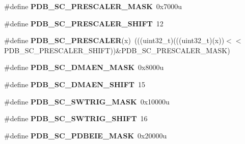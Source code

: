 \begin{DoxyCompactItemize}
\item 
\#define {\bfseries P\+D\+B\+\_\+\+S\+C\+\_\+\+P\+R\+E\+S\+C\+A\+L\+E\+R\+\_\+\+M\+A\+SK}~0x7000u\hypertarget{group__PDB__Register__Masks_ga53e475cc672b4e976c7dccc10fe64d74}{}\label{group__PDB__Register__Masks_ga53e475cc672b4e976c7dccc10fe64d74}

\item 
\#define {\bfseries P\+D\+B\+\_\+\+S\+C\+\_\+\+P\+R\+E\+S\+C\+A\+L\+E\+R\+\_\+\+S\+H\+I\+FT}~12\hypertarget{group__PDB__Register__Masks_gae8062c54fb9d63becd95c6e34399b995}{}\label{group__PDB__Register__Masks_gae8062c54fb9d63becd95c6e34399b995}

\item 
\#define {\bfseries P\+D\+B\+\_\+\+S\+C\+\_\+\+P\+R\+E\+S\+C\+A\+L\+ER}(x)~(((uint32\+\_\+t)(((uint32\+\_\+t)(x))$<$$<$P\+D\+B\+\_\+\+S\+C\+\_\+\+P\+R\+E\+S\+C\+A\+L\+E\+R\+\_\+\+S\+H\+I\+FT))\&P\+D\+B\+\_\+\+S\+C\+\_\+\+P\+R\+E\+S\+C\+A\+L\+E\+R\+\_\+\+M\+A\+SK)\hypertarget{group__PDB__Register__Masks_ga5b7cd747de95052518759e92b7e0f867}{}\label{group__PDB__Register__Masks_ga5b7cd747de95052518759e92b7e0f867}

\item 
\#define {\bfseries P\+D\+B\+\_\+\+S\+C\+\_\+\+D\+M\+A\+E\+N\+\_\+\+M\+A\+SK}~0x8000u\hypertarget{group__PDB__Register__Masks_gae2e04f313df4593c36890e463071fe5b}{}\label{group__PDB__Register__Masks_gae2e04f313df4593c36890e463071fe5b}

\item 
\#define {\bfseries P\+D\+B\+\_\+\+S\+C\+\_\+\+D\+M\+A\+E\+N\+\_\+\+S\+H\+I\+FT}~15\hypertarget{group__PDB__Register__Masks_ga06b0f6651787dda98baf8953321b101b}{}\label{group__PDB__Register__Masks_ga06b0f6651787dda98baf8953321b101b}

\item 
\#define {\bfseries P\+D\+B\+\_\+\+S\+C\+\_\+\+S\+W\+T\+R\+I\+G\+\_\+\+M\+A\+SK}~0x10000u\hypertarget{group__PDB__Register__Masks_gaee37e4f669c308f1bfa17462ccbdc44b}{}\label{group__PDB__Register__Masks_gaee37e4f669c308f1bfa17462ccbdc44b}

\item 
\#define {\bfseries P\+D\+B\+\_\+\+S\+C\+\_\+\+S\+W\+T\+R\+I\+G\+\_\+\+S\+H\+I\+FT}~16\hypertarget{group__PDB__Register__Masks_ga494cf2eed3e90d588c9d6a79cdb5aaaa}{}\label{group__PDB__Register__Masks_ga494cf2eed3e90d588c9d6a79cdb5aaaa}

\item 
\#define {\bfseries P\+D\+B\+\_\+\+S\+C\+\_\+\+P\+D\+B\+E\+I\+E\+\_\+\+M\+A\+SK}~0x20000u\hypertarget{group__PDB__Register__Masks_gadad9b8b56988b977ed415ab18985f9dc}{}\label{group__PDB__Register__Masks_gadad9b8b56988b977ed415ab18985f9dc}


\end{DoxyCompactItemize}
